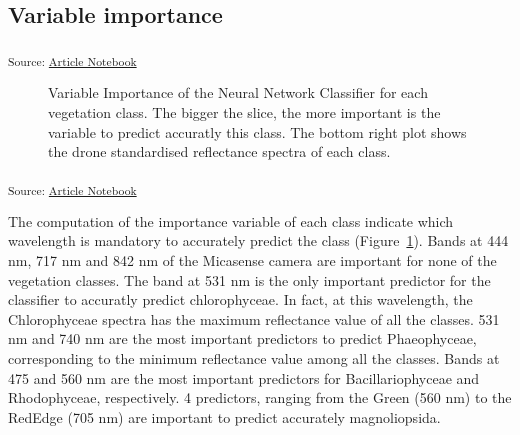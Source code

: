 \documentclass[
  number]{elsarticle}
\begin{document}
\subsection{Variable importance}\label{variable-importance}

\textsubscript{Source:
\href{https://SigOiry.github.io/Drone_Paper_2023/index.qmd.html}{Article
Notebook}}

\label{cell-fig-VIP}
\begin{figure}[H]


\caption{\label{fig-VIP}Variable Importance of the Neural Network
Classifier for each vegetation class. The bigger the slice, the more
important is the variable to predict accuratly this class. The bottom
right plot shows the drone standardised reflectance spectra of each
class.}

\end{figure}%

\textsubscript{Source:
\href{https://SigOiry.github.io/Drone_Paper_2023/index.qmd.html}{Article
Notebook}}

The computation of the importance variable of each class indicate which
wavelength is mandatory to accurately predict the class
(Figure~\ref{fig-VIP}). Bands at 444 nm, 717 nm and 842 nm of the
Micasense camera are important for none of the vegetation classes. The
band at 531 nm is the only important predictor for the classifier to
accuratly predict chlorophyceae. In fact, at this wavelength, the
Chlorophyceae spectra has the maximum reflectance value of all the
classes. 531 nm and 740 nm are the most important predictors to predict
Phaeophyceae, corresponding to the minimum reflectance value among all
the classes. Bands at 475 and 560 nm are the most important predictors
for Bacillariophyceae and Rhodophyceae, respectively. 4 predictors,
ranging from the Green (560 nm) to the RedEdge (705 nm) are important to
predict accurately magnoliopsida.
\end{document}
